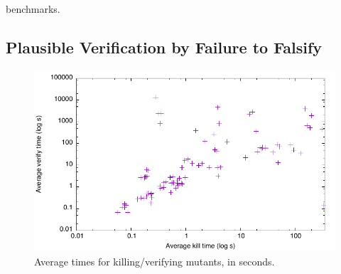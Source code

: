 \documentclass{svjour3}
\begin{document}
benchmarks. 

\subsection{Plausible Verification by Failure to Falsify}
\label{sec:sattimes}

\begin{figure}
\includegraphics[width=\columnwidth]{sattimes}
\caption{Average times for killing/verifying mutants, in seconds.}
\label{fig:sattimes}
\end{figure}
\end{document}
